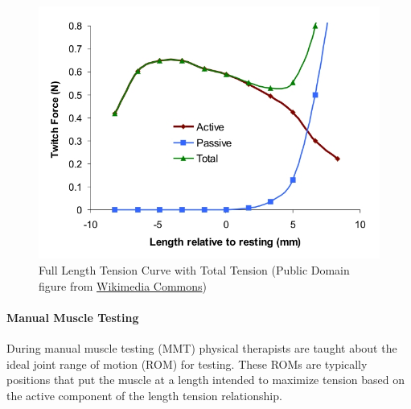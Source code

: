 \begin{figure}[!ht]
    \centering
    \includegraphics[width=1\linewidth]{./figure/lt.jpg}
    \caption{Full Length Tension Curve with Total Tension \footnotesize{(Public Domain figure from \href{https://commons.wikimedia.org/wiki/File:Lengthtension.jpg}{Wikimedia Commons})}}
    \label{fig:lt}
\end{figure}


\paragraph{Manual Muscle Testing} During manual muscle testing (MMT) physical therapists are taught about the ideal joint range of motion (ROM) for testing. These ROMs are typically positions that put the muscle at a length intended to maximize tension based on the active component of the length tension relationship. 

